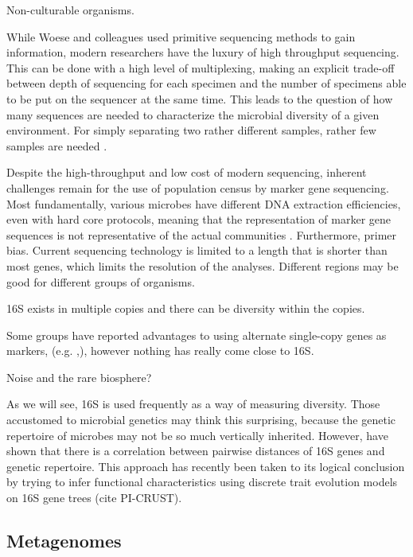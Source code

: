 \documentclass{amsart}
\begin{document}
Non-culturable organisms.

While Woese and colleagues used primitive sequencing methods to gain information, modern researchers have the luxury of high throughput sequencing.
This can be done with a high level of multiplexing, making an explicit trade-off between depth of sequencing for each specimen and the number of specimens able to be put on the sequencer at the same time.
This leads to the question of how many sequences are needed to characterize the microbial diversity of a given environment.
For simply separating two rather different samples, rather few samples are needed \cite{kuczynski2010microbial}.

Despite the high-throughput and low cost of modern sequencing, inherent challenges remain for the use of population census by marker gene sequencing.
Most fundamentally, various microbes have different DNA extraction efficiencies, even with hard core protocols, meaning that the representation of marker gene sequences is not representative of the actual communities \cite{morgan2010metagenomic}.
Furthermore, primer bias.
Current sequencing technology is limited to a length that is shorter than most genes, which limits the resolution of the analyses.
Different regions may be good for different groups of organisms.

16S exists in multiple copies and there can be diversity within the copies.
\citet{kembel2012incorporating}

Some groups have reported advantages to using alternate single-copy genes as markers, (e.g. \cite{case2007rpob},\cite{mcnabb2004hsp65}), however nothing has really come close to 16S.

Noise and the rare biosphere?

As we will see, 16S is used frequently as a way of measuring diversity.
Those accustomed to microbial genetics may think this surprising, because the genetic repertoire of microbes may not be so much vertically inherited.
However, \citep{zaneveld2010ribosomal} have shown that there is a correlation between pairwise distances of 16S genes and genetic repertoire.
This approach has recently been taken to its logical conclusion by trying to infer functional characteristics using discrete trait evolution models on 16S gene trees (cite PI-CRUST).


\subsection{Metagenomes}
\end{document}
